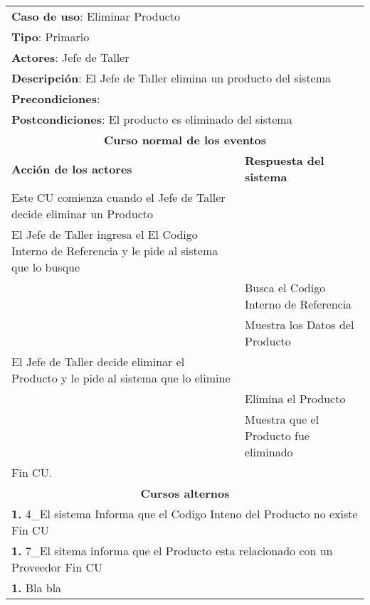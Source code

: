 \begin{longtable}{ |p{8cm}|p{8cm}| }
		\hline
		\multicolumn{2}{|p{16cm}|}{\textbf{Caso de uso}: Eliminar Producto }\\
		\multicolumn{2}{|p{16cm}|}{\textbf{Tipo}: Primario }\\
		\multicolumn{2}{|p{16cm}|}{\textbf{Actores}: Jefe de Taller }\\
		\multicolumn{2}{|p{16cm}|}{\textbf{Descripción}: El Jefe de Taller elimina un producto del sistema }\\
		\multicolumn{2}{|p{16cm}|}{\textbf{Precondiciones}: }\\
		\multicolumn{2}{|p{16cm}|}{\textbf{Postcondiciones}:  El producto es eliminado del sistema  }\\
		\hline
		\multicolumn{2}{|c|}{\textbf{Curso normal de los eventos}}\\
		\hline
		\textbf{Acción de los actores} & \textbf{Respuesta del sistema}\\
		\hline
			\inc Este CU comienza cuando el Jefe de Taller decide eliminar un Producto & \\
			\hline
			\inc El Jefe de Taller ingresa el El Codigo Interno de Referencia y le pide al sistema que lo busque &  \\
			\hline
			& \inc Busca el Codigo Interno de Referencia \\
			\hline
			& \inc Muestra los Datos del Producto \\
			\hline
			\inc El Jefe de Taller decide eliminar el Producto y le pide al sistema que lo elimine &\\
			\hline
			& \inc Elimina el Producto \\
			\hline
			& \inc Muestra que el Producto fue eliminado \\
			\hline
			\inc Fin CU. & \\
		\hline
		\multicolumn{2}{|c|}{\textbf{Cursos alternos}}\\
		\hline
		\multicolumn{2}{|p{16cm}|}{\textbf{1. }4_El sistema Informa que el Codigo Inteno del Producto no existe Fin CU}\\
		\hline
		\multicolumn{2}{|p{16cm}|}{\textbf{1. }7_El sitema informa que el Producto esta relacionado con un Proveedor Fin CU}\\
		\hline
		\multicolumn{2}{|p{16cm}|}{\textbf{1. }Bla bla }\\
		\hline	
	\end{longtable}